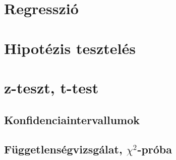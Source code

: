 \documentclass[12pt]{article}
\theoremstyle{plain}
\begin{document}
\section{Regresszió}
\section{Hipotézis tesztelés}
\section{z-teszt, t-test}
\subsection{Konfidenciaintervallumok}
\subsection{Függetlenségvizsgálat, $\chi^2$-próba}



\end{document}
